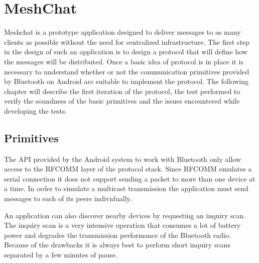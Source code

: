 \chapter{MeshChat}
Meshchat is a prototype application designed to deliver messages to as many clients as possible without the need for centralized infrastructure.
The first step in the design of such an application is to design a protocol that will define how the messages will be distributed.
Once a basic idea of protocol is in place it is necessary to understand whether or not the communication primitives provided by Bluetooth on Android are suitable to implement the protocol.
The following chapter will describe the first iteration of the protocol, the test performed to verify the soundness of the basic primitives and the issues encountered while developing the tests.

\section{Primitives}
The API provided by the Android system to work with Bluetooth only allow access to the RFCOMM layer of the protocol stack.
Since RFCOMM emulates a serial connection it does not support sending a packet to more than one device at a time.
In order to simulate a multicast transmission the application must send messages to each of its peers individually.

An application can also discover nearby devices by requesting an inquiry scan.
The inquiry scan is a very intensive operation that consumes a lot of battery power and degrades the transmission performance of the Bluetooth radio.
Because of the drawbacks it is always best to perform short inquiry scans separated by a few minutes of pause.



